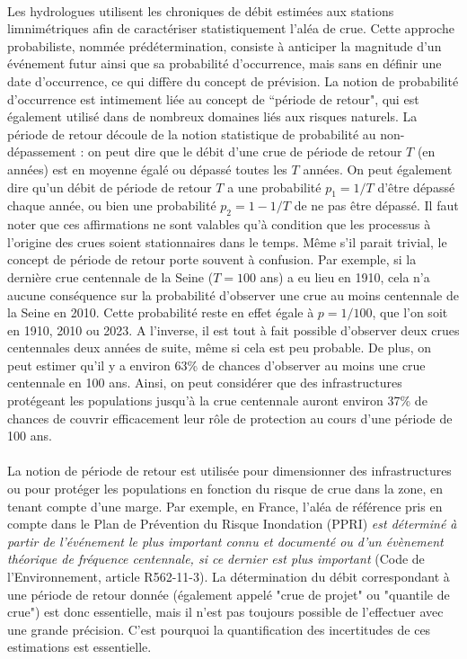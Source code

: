 	\paragraph{} Les hydrologues utilisent les chroniques de débit estimées aux stations limnimétriques afin de caractériser statistiquement l'aléa de crue. Cette approche probabiliste, nommée prédétermination, consiste à anticiper la magnitude d'un événement futur ainsi que sa probabilité d'occurrence, mais sans en définir une date d'occurrence, ce qui diffère du concept de prévision. La notion de probabilité d'occurrence est intimement liée au concept de ``période de retour", qui est également utilisé dans de nombreux domaines liés aux risques naturels. La période de retour découle de la notion statistique de probabilité au non-dépassement : on peut dire que le débit d'une crue de période de retour $T$ (en années) est en moyenne égalé ou dépassé toutes les $T$ années. On peut également dire qu'un débit de période de retour $T$ a une probabilité $p_1 = 1/T$ d'être dépassé chaque année, ou bien une probabilité $p_2 = 1-1/T$ de ne pas être dépassé. Il faut noter que ces affirmations ne sont valables qu'à condition que les processus à l'origine des crues soient stationnaires dans le temps. Même s'il parait trivial, le concept de période de retour porte souvent à confusion. Par exemple, si la dernière crue centennale de la Seine ($T = 100$ ans) a eu lieu en 1910, cela n'a aucune conséquence sur la probabilité d'observer une crue au moins centennale de la Seine en 2010. Cette probabilité reste en effet égale à $p = 1/100$, que l'on soit en 1910, 2010 ou 2023. A l'inverse, il est tout à fait possible d'observer deux crues centennales deux années de suite, même si cela est peu probable. De plus, on peut estimer qu'il y a environ 63\% de chances d'observer au moins une crue centennale en 100 ans. Ainsi, on peut considérer que des infrastructures protégeant les populations jusqu'à la crue centennale auront environ 37\% de chances de couvrir efficacement leur rôle de protection au cours d'une période de 100 ans. 	
	
	\paragraph{} La notion de période de retour est utilisée pour dimensionner des infrastructures ou pour protéger les populations en fonction du risque de crue dans la zone, en tenant compte d'une marge. Par exemple, en France, l'aléa de référence pris en compte dans le Plan de Prévention du Risque Inondation (PPRI) \og \textit{est déterminé à partir de l'événement le plus important connu et documenté ou d'un évènement théorique de fréquence centennale, si ce dernier est plus important}\fg{} (Code de l'Environnement, article R562-11-3). La détermination du débit correspondant à une période de retour donnée (également appelé "crue de projet" ou "quantile de crue") est donc essentielle, mais il n'est pas toujours possible de l'effectuer avec une grande précision. C'est pourquoi la quantification des incertitudes de ces estimations est essentielle.
	
